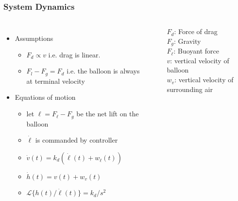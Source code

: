 \documentclass[10pt,mathserif]{beamer}
\begin{document}
\begin{frame}
\frametitle{System Dynamics}
\begin{columns}
\begin{itemize}\itemsep=12pt
\item Assumptions
\vspace*{0.5em}
\begin{itemize}
\item $F_d \propto v$ i.e. drag is linear.
\item $F_l - F_g = F_d$ i.e. the balloon is always at terminal velocity 
\end{itemize}
\item Equations of motion
\vspace*{0.5em}
\begin{itemize}
\item let $\ell = F_{\ell} - F_g$ be the net lift on the balloon
\item $\dot \ell$ is commanded by controller
\item $\dot v(t) = k_d (\dot \ell(t) + w_{\dot \ell} (t))$
\item $\dot h(t) = v(t) +  w_v(t)$
\item $\mathcal{L}\{h(t) / \dot \ell (t) \} = k_{d} / s^2$
\end{itemize}
\end{itemize}


\begin{center}
\end{center}
$F_d$: Force of drag\\
$F_g$: Gravity\\
$F_{\ell}$: Buoyant force\\
$v$: vertical velocity of balloon\\
$w_v$: vertical velocity of surrounding air
\end{columns}
\end{frame}
\end{document}
